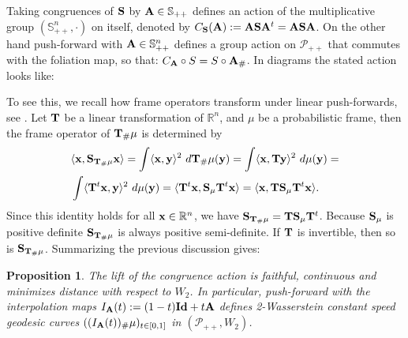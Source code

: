 \documentclass{amsart}
\numberwithin{equation}{section}
\newcommand\cP{{\mathcal P}}
\newcommand\bA{{\bf A}}
\newcommand\bS{{\bf S}}
\newcommand\bT{{\bf T}}
\newcommand\R{{\mathbb R}}
\newcommand\id{{\operatorname{\bf Id}}}
\newcommand\tr{{\operatorname{tr}}}
\theoremstyle{plain}
\newtheorem{proposition}[subsection]{Proposition}
\theoremstyle{definition}
\begin{document}
Taking congruences of $\bS$ by $\bA\in {\mathbb S}_{++}$  defines an action of the multiplicative group 
$({\mathbb S}^n_{++},\cdot)$ on itself, denoted by $C_{\bS}(\bA):= \bA\bS\bA^t=\bA\bS\bA$. 
On the other hand push-forward with $\bA \in {\mathbb S}^n_{++}$ defines a group action on $\cP_{++}$ that commutes 
with the foliation map, so that: $C_{\bA} \circ S= S \circ \bA_{\#}$. In diagrams the stated action looks like: 
\begin{center}
\hspace*{2cm}
\end{center}
To see this, we recall how frame operators transform under linear push-forwards, see \cite{loukili2020minimization}. 
Let $\bT$ be a linear transformation of $\R^n$, and $\mu$ be a probabilistic frame, then the frame operator of ${\bf T}_{\#}\mu$ is determined by     
\begin{equation}\label{fop-transform} 
\begin{split} & \langle {\bf x}, {\bf S}_{{\bf T}_{\#}\mu}{\bf x}\rangle =\int \langle{\bf x}, {\bf y}\rangle^2 \ d {\bf T}_{\#}\mu({\bf y})=
\int \langle{\bf x}, {\bf T} {\bf y}\rangle^2 \ d \mu({\bf y})=\\
&\int \langle {\bf T}^t{\bf x},  {\bf y}\rangle^2 \ d \mu({\bf y}) 
=\langle {\bf T}^t {\bf x}, {\bf S}_{\mu} {\bf T}^t {\bf x} \rangle=\langle {\bf x}, {\bf T} {\bf S}_{\mu} {\bf T}^t {\bf x} \rangle. 
\end{split}
\end{equation}
Since this identity holds for all ${\bf x}\in \R^n$, we have ${\bf S}_{{\bf T}_{\#}\mu}={\bf T} {\bf S}_{\mu} {\bf T}^t$. 
Because ${\bf S}_{\mu}$ is positive definite ${\bf S_{{\bf T}_{\#}\mu}}$ is always positive semi-definite. 
If ${\bf T}$ is invertible, then so is ${\bf S_{{\bf T}_{\#}\mu}}$. Summarizing the previous discussion gives: 
\begin{proposition}\label{prop_geod_act} 
The lift of the congruence action is faithful, continuous and minimizes distance with respect to $W_2$.  
In particular, push-forward with the interpolation maps $I_{\bA}(t):=(1-t){\bf  \id} + t\bA$ defines 2-Wasserstein constant speed geodesic curves $((I_{\bA}(t))_{\#}\mu)_{t \in [0,1]}$ in $(\cP_{++}, W_2)$.  
\end{proposition}
\end{document}
